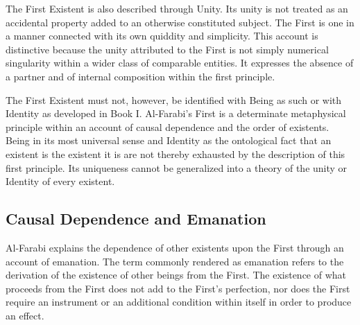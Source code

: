 \label{para:VS.B01.P01.C08.S12.SS07.P004}

The First Existent is also described
through Unity. Its unity is not
treated as an accidental property
added to an otherwise constituted
subject. The First is one in a
manner connected with its own
quiddity and simplicity. This
account is distinctive because
the unity attributed to the First
is not simply numerical singularity
within a wider class of comparable
entities. It expresses the absence
of a partner and of internal
composition within the first
principle.
\citep[pp.~66--78]{AlFarabiVirtuousCity}

\label{para:VS.B01.P01.C08.S12.SS07.P005}

The First Existent must not,
however, be identified with
Being as such or with Identity
as developed in Book I. Al-Farabi's
First is a determinate metaphysical
principle within an account of
causal dependence and the order
of existents. Being in its most
universal sense and Identity
as the ontological fact that an
existent is the existent it is
are not thereby exhausted by
the description of this first
principle. Its uniqueness cannot
be generalized into a theory
of the unity or Identity of
every existent.



\subsection{Causal Dependence and Emanation}
\label{subsec:ch08-farabi-emanation}

\label{para:VS.B01.P01.C08.S12.SS08.P001}

Al-Farabi explains the dependence
of other existents upon the First
through an account of emanation.
The term commonly rendered as
emanation refers to the derivation
of the existence of other beings
from the First. The existence of
what proceeds from the First does
not add to the First's perfection,
nor does the First require an
instrument or an additional
condition within itself in order
to produce an effect.
\citep[pp.~88--92]{AlFarabiVirtuousCity}

\label{para:VS.B01.P01.C08.S12.SS08.P002}

